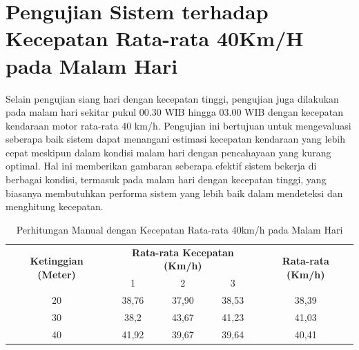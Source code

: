 \section{Pengujian Sistem terhadap Kecepatan Rata-rata 40Km/H pada Malam Hari}

Selain pengujian siang hari dengan kecepatan tinggi, pengujian juga dilakukan pada malam hari sekitar pukul 00.30 WIB hingga 03.00 WIB dengan kecepatan kendaraan motor rata-rata 40 km/h. Pengujian ini bertujuan untuk mengevaluasi seberapa baik sistem dapat menangani estimasi kecepatan kendaraan yang lebih cepat meskipun dalam kondisi malam hari dengan pencahayaan yang kurang optimal. Hal ini memberikan gambaran seberapa efektif sistem bekerja di berbagai kondisi, termasuk pada malam hari dengan kecepatan tinggi, yang biasanya membutuhkan performa sistem yang lebih baik dalam mendeteksi dan menghitung kecepatan.

\begin{table}[H]
	\caption{Perhitungan Manual dengan Kecepatan Rata-rata 40km/h pada Malam Hari}
    \label{table:40km/h-malam-manual}
	\centering
	\begin{tabular}{|c|c|c|c|c|}
		\hline
		\multirow{2}{*}{\textbf{Ketinggian (Meter)}} & \multicolumn{3}{c|}{\textbf{Rata-rata Kecepatan (Km/h)}} & \multirow{2}{*}{\textbf{Rata-rata (Km/h)}} \\ \cline{2-4}
		& 1 & 2 & 3 & \\ \hline
		20 & 38,76 & 37,90 & 38,53 & 38,39 \\
		30 & 38,2 & 43,67 & 41,23 & 41,03 \\
		40 & 41,92 & 39,67 & 39,64 & 40,41 \\ \hline
	\end{tabular}
\end{table}
\vspace{-10pt}

